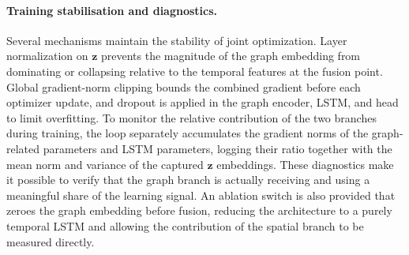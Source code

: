 \paragraph{Training stabilisation and diagnostics.}
Several mechanisms maintain the stability of joint optimization. Layer normalization on $\mathbf{z}$ prevents the magnitude of the graph embedding from dominating or collapsing relative to the temporal features at the fusion point. Global gradient-norm clipping bounds the combined gradient before each optimizer update, and dropout is applied in the graph encoder, LSTM, and head to limit overfitting. To monitor the relative contribution of the two branches during training, the loop separately accumulates the gradient norms of the graph-related parameters and LSTM parameters, logging their ratio together with the mean norm and variance of the captured $\mathbf{z}$ embeddings. These diagnostics make it possible to verify that the graph branch is actually receiving and using a meaningful share of the learning signal. An ablation switch is also provided that zeroes the graph embedding before fusion, reducing the architecture to a purely temporal LSTM and allowing the contribution of the spatial branch to be measured directly.

